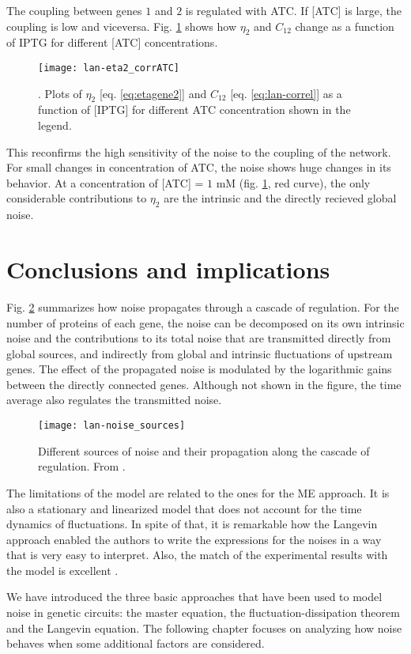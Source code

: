 The coupling between genes $1$ and $2$ is regulated with ATC. If [ATC] is large, the coupling is low and viceversa. Fig. \ref{fig:lan-eta2_corrATC} shows how $\eta_2$ and $C_{12}$ change as a function of IPTG for different [ATC] concentrations.
\begin{figure}[H]
  \centering
  \texttt{[image: lan-eta2\_corrATC]}
  \caption[Noise in gene $2$ for varying ATC concentrations]{\label{fig:lan-eta2_corrATC}. Plots of $\eta_2$ [eq. \eqref{eq:etagene2}] and $C_{12}$ [eq. \eqref{eq:lan-correl}] as a function of [IPTG] for different ATC concentration shown in the legend.}
\end{figure}

This reconfirms the high sensitivity of the noise to the coupling of the network. For small changes in concentration of ATC, the noise shows huge changes in its behavior. At a concentration of [ATC] = $1$ mM (fig. \ref{fig:lan-eta2_corrATC}, red curve), the only considerable contributions to $\eta_2$ are the intrinsic and the directly recieved global noise.

\section{Conclusions and implications}

Fig. \ref{fig:lan-noise_sources} summarizes how noise propagates through a cascade of regulation. For the number of proteins of each gene, the noise can be decomposed on its own intrinsic noise and the contributions to its total noise that are transmitted directly from global sources, and indirectly from global and intrinsic fluctuations of upstream genes. The effect of the propagated noise is modulated by the logarithmic gains between the directly connected genes. Although not shown in the figure, the time average also regulates the transmitted noise.
\begin{figure}[H]
  \centering
  \texttt{[image: lan-noise\_sources]}
  \caption[Propagation of noise through a cascade]{\label{fig:lan-noise_sources} Different sources of noise and their propagation along the cascade of regulation. From \cite{pedraza05}.}
\end{figure}

The limitations of the model are related to the ones for the ME approach. It is also a stationary and linearized model that does not account for the time dynamics of fluctuations. In spite of that, it is remarkable how the Langevin approach enabled the authors to write the expressions for the noises in a way that is very easy to interpret. Also, the match of the experimental results with the model is excellent \cite{pedraza05} \cite{pedraza06}.

We have introduced the three basic approaches that have been used to model noise in genetic circuits: the master equation, the fluctuation-dissipation theorem and the Langevin equation. The following chapter focuses on analyzing how noise behaves when some additional factors are considered.
